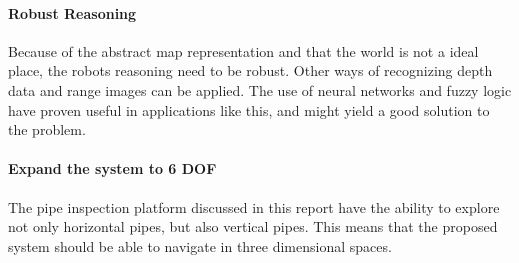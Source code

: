 \paragraph{Robust Reasoning} Because of the abstract map representation and that the world
is not a ideal place, the robots reasoning need to be robust. Other ways of recognizing
depth data and range images can be applied. The use of neural networks and fuzzy logic
have proven useful in applications like this, and might yield a good solution to the
problem. 

\paragraph{Expand the system to 6 DOF} The pipe inspection platform discussed in this report
have the ability to explore not only horizontal pipes, but also vertical pipes. This means
that the proposed system should be able to navigate in three dimensional spaces. 

